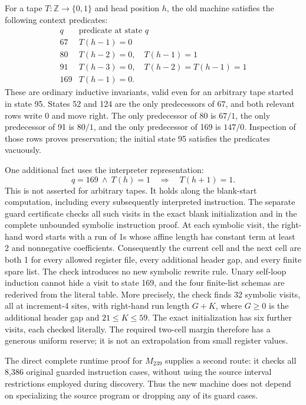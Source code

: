 For a tape $T\colon\mathbb Z\to\{0,1\}$ and head position $h$, the old
machine satisfies the following context predicates:
\[
\begin{array}{c|l}
q&\text{predicate at state }q\\\hline
67&T(h-1)=0\\
80&T(h-2)=0,\quad T(h-1)=1\\
91&T(h-3)=0,\quad T(h-2)=T(h-1)=1\\
169&T(h-1)=0.
\end{array}
\]
These are ordinary inductive invariants, valid even for an arbitrary tape
started in state 95.  States 52 and 124 are the only predecessors of 67,
and both relevant rows write 0 and move right.  The only predecessor of
80 is $67/1$, the only predecessor of 91 is $80/1$, and the only predecessor
of 169 is $147/0$.  Inspection of those rows proves preservation; the
initial state 95 satisfies the predicates vacuously.

One additional fact uses the interpreter representation:
\begin{equation}\label{eq:selector169guard}
q=169\ \land\ T(h)=1\quad\Longrightarrow\quad T(h+1)=1.
\end{equation}
This is not asserted for arbitrary tapes.  It holds along the blank-start
computation, including every subsequently interpreted instruction.  The
separate guard certificate checks all such visits in the exact blank
initialization and in the complete unbounded symbolic instruction proof.
At each symbolic visit, the right-hand word starts with a run of 1s whose
affine length has constant term at least 2 and nonnegative coefficients.
Consequently the current cell and the next cell are both 1 for every
allowed register file, every additional header gap, and every finite
spare list.  The check introduces no new symbolic rewrite rule.  Unary
self-loop induction cannot hide a visit to state 169, and the four
finite-list schemas are rederived from the literal table.
More precisely, the check finds 32 symbolic visits, all at increment-4
sites, with right-hand run length $G+K$, where $G\geq0$ is the additional
header gap and $21\leq K\leq59$.  The exact initialization has six further
visits, each checked literally.  The required two-cell margin therefore
has a generous uniform reserve; it is not an extrapolation from small
register values.

The direct complete runtime proof for $M_{239}$ supplies a second route:
it checks all 8,386 original guarded instruction cases, without using the
source interval restrictions employed during discovery.  Thus the new
machine does not depend on specializing the source program or dropping
any of its guard cases.

